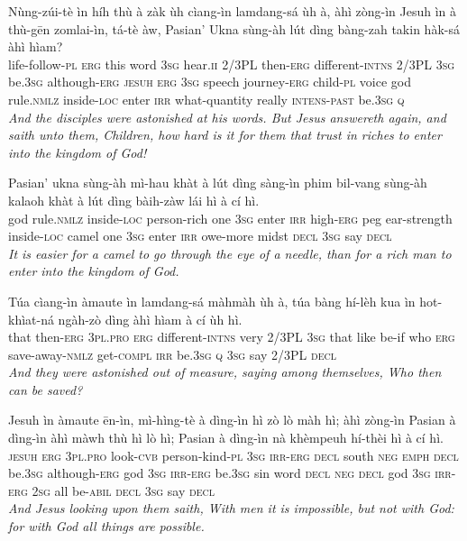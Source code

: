 \documentclass[11pt,a4paper]{article}
\begin{document}
\begin{exe}
\gll Nùng-zúi-tè ìn híh thù à zàk ùh cìang-ìn lamdang-sá ùh à, àhì zòng-ìn Jesuh ìn à thù-gēn zomlai-ìn, tá-tè àw, Pasian' Ukna sùng-àh lút dìng bàng-zah takin hàk-sá àhì hìam? \\
     life-follow-\textsc{pl} \textsc{erg} this word \textsc{3sg} hear.\textsc{ii} 2/3PL then-\textsc{erg} different-\textsc{intns} 2/3PL \textsc{3sg} be.\textsc{3sg} although-\textsc{erg} \textsc{jesuh} \textsc{erg} \textsc{3sg} speech journey-\textsc{erg} child-\textsc{pl} voice god rule.\textsc{nmlz} inside-\textsc{loc} enter \textsc{irr} what-quantity really \textsc{intens}-\textsc{past} be.\textsc{3sg} \textsc{q} \\
\glt \textcolor{kjvcolor}{\textit{And the disciples were astonished at his words. But Jesus answereth again, and saith unto them, Children, how hard is it for them that trust in riches to enter into the kingdom of God!}}

\gll Pasian' ukna sùng-àh mì-hau khàt à lút dìng sàng-ìn phim bil-vang sùng-àh kalaoh khàt à lút dìng bàih-zàw lái hì à cí hì. \\
     god rule.\textsc{nmlz} inside-\textsc{loc} person-rich one \textsc{3sg} enter \textsc{irr} high-\textsc{erg} peg ear-strength inside-\textsc{loc} camel one \textsc{3sg} enter \textsc{irr} owe-more midst \textsc{decl} \textsc{3sg} say \textsc{decl} \\
\glt \textcolor{kjvcolor}{\textit{It is easier for a camel to go through the eye of a needle, than for a rich man to enter into the kingdom of God.}}

\gll Túa cìang-ìn àmaute ìn lamdang-sá màhmàh ùh à, túa bàng hí-lèh kua ìn hot-khìat-ná ngàh-zò dìng àhì hìam à cí ùh hì. \\
     that then-\textsc{erg} \textsc{3pl}.\textsc{pro} \textsc{erg} different-\textsc{intns} very 2/3PL \textsc{3sg} that like be-if who \textsc{erg} save-away-\textsc{nmlz} get-\textsc{compl} \textsc{irr} be.\textsc{3sg} \textsc{q} \textsc{3sg} say 2/3PL \textsc{decl} \\
\glt \textcolor{kjvcolor}{\textit{And they were astonished out of measure, saying among themselves, Who then can be saved?}}

\gll Jesuh ìn àmaute ēn-ìn, mì-hìng-tè à dìng-ìn hì zò lò màh hì; àhì zòng-ìn Pasian à dìng-ìn àhì màwh thù hì lò hì; Pasian à dìng-ìn nà khèmpeuh hí-thèi hì à cí hì. \\
     \textsc{jesuh} \textsc{erg} \textsc{3pl}.\textsc{pro} look-\textsc{cvb} person-kind-\textsc{pl} \textsc{3sg} \textsc{irr}-\textsc{erg} \textsc{decl} south \textsc{neg} \textsc{emph} \textsc{decl} be.\textsc{3sg} although-\textsc{erg} god \textsc{3sg} \textsc{irr}-\textsc{erg} be.\textsc{3sg} sin word \textsc{decl} \textsc{neg} \textsc{decl} god \textsc{3sg} \textsc{irr}-\textsc{erg} \textsc{2sg} all be-\textsc{abil} \textsc{decl} \textsc{3sg} say \textsc{decl} \\
\glt \textcolor{kjvcolor}{\textit{And Jesus looking upon them saith, With men it is impossible, but not with God: for with God all things are possible.}}


\end{exe}
\end{document}
